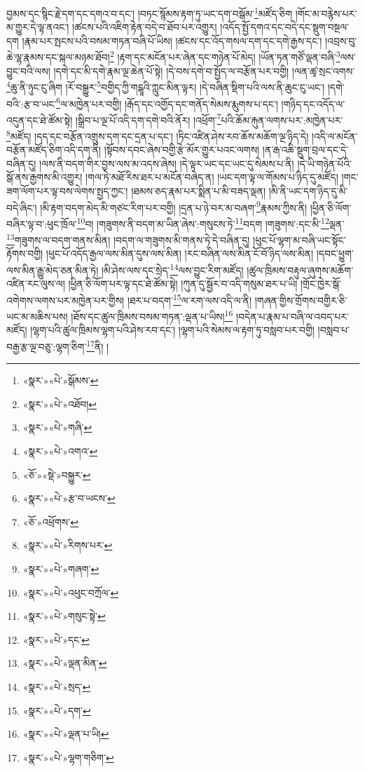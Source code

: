 བྱམས་དང་སྙིང་རྗེ་དག་དང་དགའ་བ་དང་། །བཏང་སྙོམས་རྟག་ཏུ་ཡང་དག་བསྒོམ་\footnote{«སྣར་»«པེ་»སྒོམས་}མཛོད་ཅིག །གོང་མ་བརྙེས་པར་མ་གྱུར་དེ་ལྟ་ནའང་། །ཚངས་པའི་འཇིག་རྟེན་བདེ་བ་ཐོབ་པར་འགྱུར། །འདོད་སྤྱོ་དགའ་དང་བདེ་དང་སྡུག་བསྔལ་དག །རྣམ་པར་སྤངས་པའི་བསམ་གཏན་བཞི་པོ་ཡིས། །ཚངས་དང་འོད་གསལ་དག་དང་དགེ་རྒྱས་དང་། །འབྲས་བུ་ཆེ་ལྷ་རྣམས་དང་སྐལ་མཉམ་ཐོབ།\footnote{«སྣར་»«པེ་»འཐོབ།} །རྟག་དང་མངོན་པར་ཞེན་དང་གཉེན་པོ་མེད། །ཡོན་ཏན་གཙོ་ལྡན་བཞི་\footnote{«སྣར་»«པེ་»གཞི་}ལས་བྱུང་བའི་ལས། །དགེ་དང་མི་དགེ་རྣམ་ལྔ་ཆེན་པོ་སྟེ། །དེ་བས་དགེ་བ་སྤྱོད་ལ་བརྩོན་པར་བགྱི། །ལན་ཚྭ་སྲང་འགས་\footnote{«སྣར་»«པེ་»འགའ་}ཆུ་ནི་ཉུང་ངུ་ཞིག །རོ་བསྒྱུར་\footnote{«ཅོ་»«སྡེ་»བསྐྱུར་}བགྱིད་ཀྱི་གངྒཱའི་ཀླུང་མིན་ལྟར། །དེ་བཞིན་སྡིག་པའི་ལས་ནི་ཆུང་ངུ་ཡང་། །དགེ་བའི་:རྩ་བ་ཡང་\footnote{«སྣར་»«པེ་»རྩ་བ་ཡངས་}ལ་མཁྱེན་པར་བགྱི། །རྒོད་དང་འགྱོད་དང་གནོད་སེམས་རྨུགས་པ་དང་། །གཉིད་དང་འདོད་ལ་འདུན་དང་ཐེ་ཚོམ་སྟེ། །སྒྲིབ་པ་ལྔ་པོ་འདི་དག་དགེ་བའི་ནོར། །འཕྲོག་\footnote{«ཅོ་»འཕྲོགས་}པའི་ཆོམ་རྐུན་ལགས་པར་:མཁྱེན་པར་\footnote{«སྣར་»«པེ་»རིགས་པར་}མཛོད། །དད་དང་བརྩོན་འགྲུས་དག་དང་དྲན་པ་དང་། །ཏིང་འཛིན་ཤེས་རབ་ཆོས་མཆོག་ལྔ་ཉིད་དེ། །འདི་ལ་མངོན་བརྩོན་མཛོད་ཅིག་འདི་དག་ནི། །སྟོབས་དབང་ཞེས་བགྱི་རྩེ་མོར་གྱུར་པའང་ལགས། །ན་རྒ་འཆི་སྡུག་བྲལ་དང་དེ་བཞིན་དུ། །ལས་ནི་བདག་གིར་བྱས་ལས་མ་འདས་ཞེས། །དེ་ལྟར་ཡང་དང་ཡང་དུ་སེམས་པ་ནི། །དེ་ཡི་གཉེན་པོའི་སྒོ་ནས་རྒྱགས་མི་འགྱུར། །གལ་ཏེ་མཐོ་རིས་ཐར་པ་མངོན་བཞེད་ན། །ཡང་དག་ལྟ་ལ་གོམས་པ་ཉིད་དུ་མཛོད། །གང་ཟག་ལོག་པར་ལྟ་བས་ལེགས་སྤྱད་ཀྱང་། །ཐམས་ཅད་རྣམ་པར་སྨིན་པ་མི་བཟད་ལྡན། །མི་ནི་ཡང་དག་ཉིད་དུ་མི་བདེ་ཞིང་། །མི་རྟག་བདག་མེད་མི་གཙང་རིག་པར་བགྱི། །དྲན་པ་ཉེ་བར་མ་བཞག་\footnote{«སྣར་»«པེ་»གཞག་}རྣམས་ཀྱིས་ནི། །ཕྱིན་ཅི་ལོག་བཞིར་ལྟ་བ་:ཕུང་ཁྲོལ་\footnote{«སྣར་»«པེ་»འཕུང་བཀྲོལ་}བ། །གཟུགས་ནི་བདག་མ་ཡིན་ཞེས་:གསུངས་ཏེ་\footnote{«སྣར་»«པེ་»གསུང་སྟེ་}བདག །གཟུགས་:དང་མི་\footnote{«སྣར་»«པེ་»དང་}ལྡན་\footnote{«སྣར་»«པེ་»ལྡན་མིན་}གཟུགས་ལ་བདག་གནས་མིན། །བདག་ལ་གཟུགས་མི་གནས་ཏེ་དེ་བཞིན་དུ། །ཕུང་པོ་ལྷག་མ་བཞི་ཡང་སྟོང་རྟོགས་བགྱི། །ཕུང་པོ་འདོད་རྒྱལ་ལས་མིན་དུས་ལས་མིན། །རང་བཞིན་ལས་མིན་ངོ་བོ་ཉིད་ལས་མིན། །དབང་ཕྱུག་ལས་མིན་རྒྱུ་མེད་ཅན་མིན་ཏེ། །མི་ཤེས་ལས་དང་སྲེད་\footnote{«སྣར་»«པེ་»སྲད་}ལས་བྱུང་རིག་མཛོད། །ཚུལ་ཁྲིམས་བརྟུལ་ཞུགས་མཆོག་འཛིན་རང་ལུས་ལ། །ཕྱིན་ཅི་ལོག་པར་ལྟ་དང་ཐེ་ཚོམ་སྟེ། །ཀུན་དུ་སྦྱོར་བ་འདི་གསུམ་ཐར་པ་ཡི། །གྲོང་ཁྱེར་སྒོ་འགེགས་ལགས་པར་མཁྱེན་པར་གྱིས། །ཐར་པ་བདག་\footnote{«སྣར་»«པེ་»དག་}ལ་རག་ལས་འདི་ལ་ནི། །གཞན་གྱིས་གྲོགས་བགྱིར་ཅི་ཡང་མ་མཆིས་པས། །ཐོས་དང་ཚུལ་ཁྲིམས་བསམ་གཏན་:ལྡན་པ་ཡིས།\footnote{«སྣར་»«པེ་»ལྡན་པ་ཡི།} །བདེན་པ་རྣམ་པ་བཞི་ལ་འབད་པར་མཛོད། །ལྷག་པའི་ཚུལ་ཁྲིམས་ལྷག་པའི་ཤེས་རབ་དང་། །ལྷག་པའི་སེམས་ལ་རྟག་ཏུ་བསླབ་པར་བགྱི། །བསླབ་པ་བརྒྱ་རྩ་ལྔ་བཅུ་:ལྷག་ཅིག་\footnote{«སྣར་»«པེ་»ལྷག་གཅིག་}ནི། །
